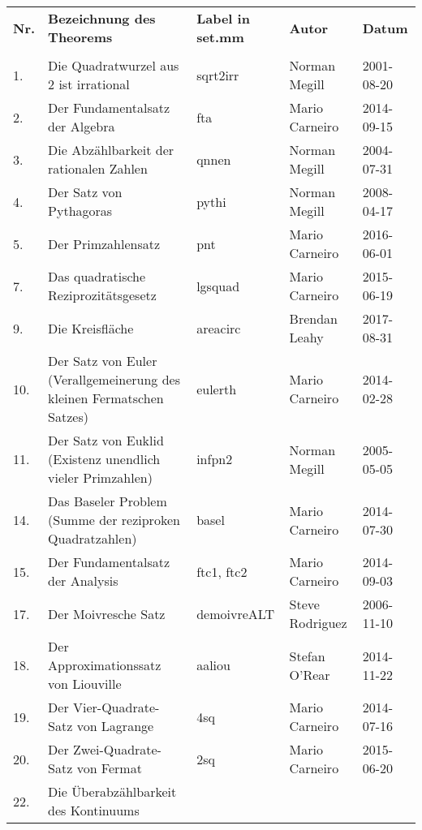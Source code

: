 \begin{longtabu}   to \textwidth {
	X[1,c]
	X[10,l]
	X[5,l]
	X[5,l]
	X[5,l]}
\textbf{Nr.} & \textbf{Bezeichnung des Theorems} & \textbf{Label in set.mm} & \textbf{Autor} & \textbf{Datum}\\
& & & & \\
.  & Die Quadratwurzel aus 2 ist irrational        & sqrt2irr     & Norman Megill     & 2001-08-20 \\
2.  & Der Fundamentalsatz der Algebra               & fta          & Mario Carneiro    & 2014-09-15 \\
3.  & Die Abzählbarkeit der rationalen Zahlen       & qnnen        & Norman Megill     & 2004-07-31 \\
4.  & Der Satz von Pythagoras                       & pythi        & Norman Megill     & 2008-04-17 \\
5.  & Der Primzahlensatz                            & pnt          & Mario Carneiro    & 2016-06-01 \\
7.  & Das quadratische Reziprozitätsgesetz          & lgsquad      & Mario Carneiro    & 2015-06-19 \\
9.  & Die Kreisfläche                               & areacirc     & Brendan Leahy     & 2017-08-31 \\
10. & Der Satz von Euler (Verallgemeinerung  
      des kleinen Fermatschen Satzes)               & eulerth      & Mario Carneiro    & 2014-02-28 \\
11. & Der Satz von Euklid
      (Existenz unendlich vieler Primzahlen)        & infpn2       & Norman Megill     & 2005-05-05 \\
14. & Das Baseler Problem 
      (Summe der reziproken Quadratzahlen)          & basel        & Mario Carneiro    & 2014-07-30 \\
15. & Der Fundamentalsatz der Analysis              & ftc1, ftc2   & Mario Carneiro    & 2014-09-03 \\
17. & Der Moivresche Satz                           & demoivreALT  & Steve Rodriguez   & 2006-11-10 \\
18. & Der Approximationssatz von Liouville          & aaliou       & Stefan O'Rear     & 2014-11-22 \\
19. & Der Vier-Quadrate-Satz von Lagrange           & 4sq          & Mario Carneiro    & 2014-07-16 \\
20. & Der Zwei-Quadrate-Satz von Fermat             & 2sq          & Mario Carneiro    & 2015-06-20 \\
22. & Die Überabzählbarkeit des Kontinuums

\end{longtabu}
